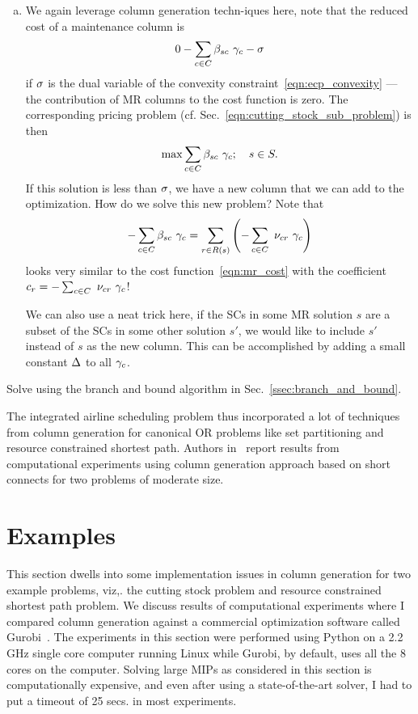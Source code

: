 \documentclass[letterpaper, 10pt, twocolumn, reqno]{amsart}
\begin{document}
{\begin{enumerate}[(a)]
            \item We again leverage column generation techn-iques here, note that the reduced cost of a maintenance column is
            $$
            0 - \sum_{c \in C} \beta_{sc}\ \gamma_c - \sigma
            $$
            if $\sigma$ is the dual variable of the convexity constraint~\eqref{eqn:ecp_convexity} --- the contribution of MR columns to the cost function is zero. The corresponding pricing problem (cf. Sec.~\ref{eqn:cutting_stock_sub_problem}) is then
            $$
            \max \sum_{c \in C} \beta_{sc}\ \gamma_c; \quad s \in S.
            $$
            If this solution is less than $\sigma$, we have a new column that we can add to the optimization. How do we solve this new problem? Note that
            $$
            -\sum_{c \in C} \beta_{sc}\ \gamma_c = \sum_{r \in R(s)} \left(-\sum_{c \in C}\ \nu_{cr}\ \gamma_c\right)
            $$
            looks very similar to the cost function~\eqref{eqn:mr_cost} with the coefficient $c_r = -\sum_{c \in C}\ \nu_{cr}\ \g_c$!

            We can also use a neat trick here, if the SCs in some MR solution $s$ are a subset of the SCs in some other solution $s'$, we would like to include $s'$ instead of $s$ as the new column. This can be accomplished by adding a small constant $\Delta$ to all $\gamma_c$.
        \end{enumerate}

    \item Solve using the branch and bound algorithm in Sec.~\ref{ssec:branch_and_bound}.

}
The integrated airline scheduling problem thus incorporated a lot of techniques from column generation for canonical OR problems like set partitioning and resource constrained shortest path. Authors in~\cite{cohn2003improving} report results from computational experiments using column generation approach based on short connects for two problems of moderate size.

\section{Examples}
\label{sec:examples}

This section dwells into some implementation issues in column generation for two example problems, viz,. the cutting stock problem and resource constrained
shortest path problem. We discuss results of computational experiments where I compared column generation against a commercial optimization software called
Gurobi~\cite{gurobi}. The experiments in this section were performed using Python on a 2.2 GHz single core computer running Linux while Gurobi, by default, uses all the 8 cores on the computer.
Solving large MIPs as considered in this section is computationally expensive, and even after using a state-of-the-art solver, I had to put a timeout of 25 secs. in most experiments.
\end{document}
